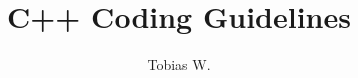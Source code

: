


\title{C++ Coding Guidelines}
\author{Tobias W.}
\maketitle

\tableofcontents
\newpage


\newpage

\newpage

\newpage
